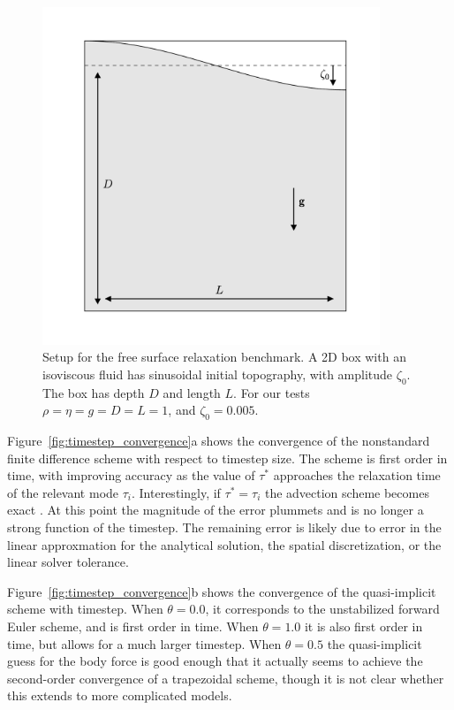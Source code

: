 \documentclass[preprint,12pt,authoryear]{elsarticle}
\begin{document}
\begin{figure}
\includegraphics[width=0.9\textwidth]{figures/benchmark_setup.pdf}
\caption{Setup for the free surface relaxation benchmark. A 2D box with an isoviscous fluid has sinusoidal initial topography, with amplitude $\zeta_0$. The box has depth $D$ and length $L$. For our tests $\rho = \eta = g = D = L = 1$, and $\zeta_0 = 0.005$.}
\label{fig:benchmark_setup}
\end{figure}

Figure~\ref{fig:timestep_convergence}a shows the convergence of the nonstandard finite difference scheme 
with respect to timestep size. The scheme is first order in time, with improving accuracy as the value of $\tau^*$ approaches
the relaxation time of the relevant mode $\tau_i$. Interestingly, if $\tau^* = \tau_i$ the advection scheme
becomes exact \citep{mickens2002nonstandard}. At this point the magnitude of the error plummets and is no longer 
a strong function of the timestep. The remaining error is likely due to error in the linear approxmation for 
the analytical solution, the spatial discretization, or the linear solver tolerance. 

Figure~\ref{fig:timestep_convergence}b shows the convergence of the quasi-implicit scheme with timestep.
When $\theta=0.0$, it corresponds to the unstabilized forward Euler scheme, and is first order in time. 
When $\theta=1.0$ it is also first order in time, but allows for a much larger timestep.  When $\theta=0.5$
the quasi-implicit guess for the body force is good enough that it actually seems to achieve the second-order 
convergence of a trapezoidal scheme, though it is not clear whether this extends to more complicated models.
\end{document}
